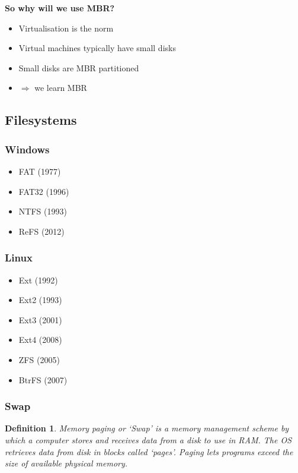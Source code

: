 \documentclass{article}
\newtheorem{theorem}{Definition}[section]
\begin{document}
\textbf{So why will we use MBR?}

\begin{itemize}
    \item Virtualisation is the norm
    \item Virtual machines typically have small disks
    \item Small disks are MBR partitioned
    \item $\Rightarrow$ we learn MBR
\end{itemize}


\subsection{Filesystems}

\subsubsection{Windows}

\begin{itemize}
    \item FAT (1977)
    \item FAT32 (1996)
    \item NTFS (1993)
    \item ReFS (2012)
\end{itemize}

\subsubsection{Linux}

\begin{itemize}
    \item Ext (1992)
    \item Ext2 (1993)
    \item Ext3 (2001)
    \item Ext4 (2008)
    \item ZFS (2005)
    \item BtrFS (2007)
\end{itemize}

\subsubsection{Swap}

\begin{theorem}
    Memory paging or `Swap' is a memory management scheme by which a computer stores and receives data from a disk
    to use in RAM. The OS retrieves data from disk in blocks called `pages'. Paging lets programs exceed the size of available
    physical memory.
\end{theorem}
\end{document}
